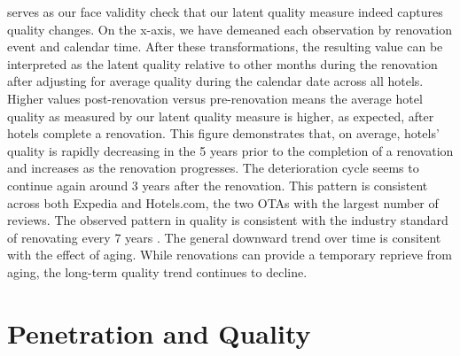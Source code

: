 \documentclass[mksc,blindrev]{informs3} %
\begin{document}
 serves as our face validity check that our latent quality measure indeed captures quality changes. On the x-axis, we have demeaned each observation by renovation event and calendar time. After these transformations, the resulting value can be interpreted as the latent quality relative to other months during the renovation after adjusting for average quality during the calendar date across all hotels. Higher values post-renovation versus pre-renovation means the average hotel quality as measured by our latent quality measure is higher, as expected, after hotels complete a renovation. This figure demonstrates that, on average, hotels' quality is rapidly decreasing in the 5 years prior to the completion of a renovation and increases as the renovation progresses. The deterioration cycle seems to continue again around 3 years after the renovation. This pattern is consistent across both Expedia and Hotels.com, the two OTAs with the largest number of reviews. The observed pattern in quality is consistent with the industry standard of renovating every 7 years \citep{renofreq2008}. The general downward trend over time is consitent with the effect of aging. While renovations can provide a temporary reprieve from aging, the long-term quality trend continues to decline. 



\section{Penetration and Quality}
\end{document}
